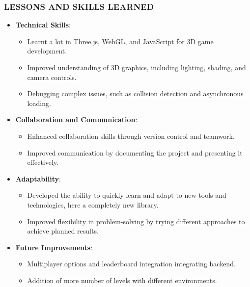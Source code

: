 \documentclass[9pt]{beamer}
\begin{document}
\begin{frame}
    \frametitle{LESSONS AND SKILLS LEARNED}
    \begin{itemize}
        \item \textbf{Technical Skills}:
        \begin{itemize}
            \item Learnt a lot in Three.js, WebGL, and JavaScript for 3D game development.
            \item Improved understanding of 3D graphics, including lighting, shading, and camera controls.
            \item Debugging complex issues, such as collision detection and asynchronous loading.
        \end{itemize}
        \vspace{0.5em}
        
        \item \textbf{Collaboration and Communication}:
        \begin{itemize}
            \item Enhanced collaboration skills through version control and teamwork.
            \item Improved communication by documenting the project and presenting it effectively.
        \end{itemize}
        \vspace{0.5em}
        
        \item \textbf{Adaptability}:
        \begin{itemize}
            \item Developed the ability to quickly learn and adapt to new tools and technologies, here a completely new library.
            \item Improved flexibility in problem-solving by trying different approaches to achieve planned results.
        \end{itemize}
        \vspace{0.5em}

        \item \textbf{Future Improvements}:
        \begin{itemize}
            \item Multiplayer options and leaderboard integration integrating backend.
            \item Addition of more number of levels with different environments.
        \end{itemize}
    \end{itemize}
    \end{frame}
    
\end{document}
